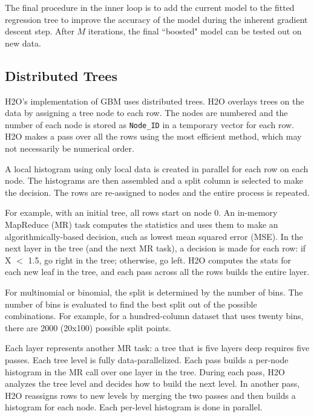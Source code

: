 The final procedure in the inner loop is to add the current model to the fitted regression tree to improve the accuracy of the model during the inherent gradient descent step. After $M$ iterations, the final ``boosted" model can be tested out on new data.


\subsection{Distributed Trees}

H2O's implementation of GBM uses distributed trees. H2O overlays trees on the data by assigning a tree node to each row.
The nodes are numbered and the number of each node is stored as {\texttt{Node\_ID}} in a temporary vector for each row. H2O makes a pass over all the rows using the most efficient method, which may not necessarily be  numerical order. 

A local
histogram using only local data is created in parallel for each row on each node. The histograms are then assembled and a split column is selected to make the decision. The rows are re-assigned to nodes and the entire process is repeated.

For example, with an initial tree, all rows start on node 0. An in-memory MapReduce (MR) task computes the statistics and uses
them to make an algorithmically-based decision, such as lowest mean squared error (MSE). In the next layer in the
tree (and the next MR task), a decision is made for each row: if X $<$ 1.5, go right in the tree; otherwise, go left.
H2O computes the stats for each new leaf in the tree, and each pass across all the rows builds the entire layer.

For multinomial or binomial, the split is determined by the number of bins. The number of bins is evaluated to
find the best split out of the possible combinations. For example, for a hundred-column dataset that uses twenty bins,
there are 2000 (20x100) possible split points.

Each layer represents another MR task: a tree that is five layers deep requires five passes. Each tree
level is fully data-parallelized. Each pass  builds a per-node histogram in the MR call over one layer in the tree.  During each pass, H2O analyzes the tree level and decides how to build the next level. In another pass, H2O reassigns rows to new levels by merging the two passes and then builds a histogram for each node. Each per-level histogram is done in parallel.


